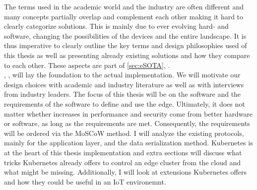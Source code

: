 {The terms used in the academic world and the industry are often different and many concepts partially overlap and complement each other making it hard to clearly categorize solutions. This is mainly due to ever evolving hard- and software, changing the possibilities of the devices and the entire landscape. It is thus imperative to clearly outline the key terms and design philosophies used of this thesis as well as presenting already existing solutions and how they compare to each other. These aspects are part of \cref{sec:eSOTA}, .\\
, , will lay the foundation to the actual implementation. We will motivate our design choices with academic and industry literature as well as with interviews from industry leaders. The focus of this thesis will be on the software and the requirements of the software to define and use the edge. Ultimately, it does not matter whether increases in performance and security come from better hardware or software, as long as the requirements are met. Consequently, the requirements will be ordered via the MoSCoW method. I will analyze the existing protocols, mainly for the application layer, and the data serialization method. Kubernetes is at the heart of this thesis implementation and extra sections will discuss what tricks Kubernetes already offers to control an edge cluster from the cloud and what might be missing. Additionally, I will look at extensions Kubernetes offers and how they could be useful in an IoT environemnt.\\


}

